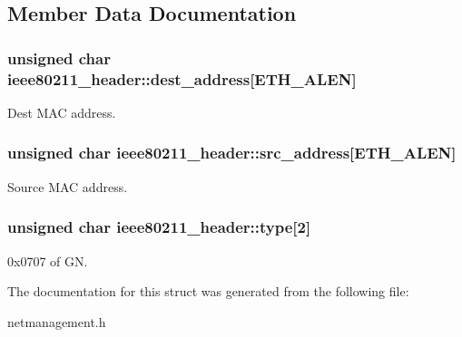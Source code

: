 \subsection{\-Member \-Data \-Documentation}
\hypertarget{structieee80211__header_a91878c441326510f5ca457aacef134a5}{
\subsubsection[{dest\-\_\-address}]{\setlength{\rightskip}{0pt plus 5cm}unsigned char {\bf ieee80211\-\_\-header\-::dest\-\_\-address}\mbox{[}\-E\-T\-H\-\_\-\-A\-L\-E\-N\mbox{]}}}\label{structieee80211__header_a91878c441326510f5ca457aacef134a5}
\-Dest \-M\-A\-C address. \hypertarget{structieee80211__header_a0be34f3634a371c30b184944b6eddfb5}{
\subsubsection[{src\-\_\-address}]{\setlength{\rightskip}{0pt plus 5cm}unsigned char {\bf ieee80211\-\_\-header\-::src\-\_\-address}\mbox{[}\-E\-T\-H\-\_\-\-A\-L\-E\-N\mbox{]}}}\label{structieee80211__header_a0be34f3634a371c30b184944b6eddfb5}
\-Source \-M\-A\-C address. \hypertarget{structieee80211__header_a09ecb123ea64ba2684d551be44ba1eb3}{
\subsubsection[{type}]{\setlength{\rightskip}{0pt plus 5cm}unsigned char {\bf ieee80211\-\_\-header\-::type}\mbox{[}2\mbox{]}}}\label{structieee80211__header_a09ecb123ea64ba2684d551be44ba1eb3}
0x0707 of \-G\-N. 

\-The documentation for this struct was generated from the following file\-:\begin{DoxyCompactItemize}
\item 
netmanagement.\-h\end{DoxyCompactItemize}
